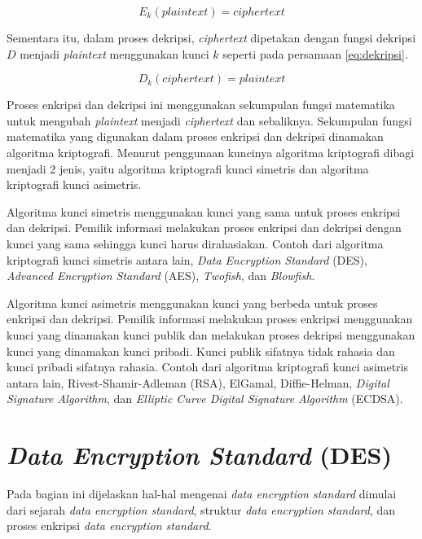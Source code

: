 \begin{equation}
	E_k(plaintext) = ciphertext
	\label{eq:enkripsi}
\end{equation}

Sementara itu, dalam proses dekripsi, \textit{ciphertext} dipetakan dengan fungsi dekripsi \begin{math}D\end{math} menjadi \textit{plaintext} menggunakan kunci \begin{math}k\end{math} seperti pada persamaan \ref{eq:dekripsi}.

\begin{equation}
	D_k(ciphertext) = plaintext
	\label{eq:dekripsi}
\end{equation}

Proses enkripsi dan dekripsi ini menggunakan sekumpulan fungsi matematika untuk mengubah \textit{plaintext} menjadi \textit{ciphertext} dan sebaliknya. Sekumpulan fungsi matematika yang digunakan dalam proses enkripsi dan dekripsi dinamakan algoritma kriptografi. Menurut penggunaan kuncinya algoritma kriptografi dibagi menjadi 2 jenis, yaitu algoritma kriptografi kunci simetris dan algoritma kriptografi kunci asimetris.

Algoritma kunci simetris menggunakan kunci yang sama untuk proses enkripsi dan dekripsi. Pemilik informasi melakukan proses enkripsi dan dekripsi dengan kunci yang sama sehingga kunci harus dirahasiakan. Contoh dari algoritma kriptografi kunci simetris antara lain, \textit{Data Encryption Standard} (DES), \textit{Advanced Encryption Standard} (AES), \textit{Twofish}, dan \textit{Blowfish}.

Algoritma kunci asimetris menggunakan kunci yang berbeda untuk proses enkripsi dan dekripsi. Pemilik informasi melakukan proses enkripsi menggunakan kunci yang dinamakan kunci publik dan melakukan proses dekripsi menggunakan kunci yang dinamakan kunci pribadi. Kunci publik sifatnya tidak rahasia dan kunci pribadi sifatnya rahasia. Contoh dari algoritma kriptografi kunci asimetris antara lain, Rivest-Shamir-Adleman (RSA), ElGamal, Diffie-Helman, \textit{Digital Signature Algorithm}, dan \textit{Elliptic Curve Digital Signature Algorithm} (ECDSA).

\section{\textit{Data Encryption Standard} (DES)}\label{sec:des}

Pada bagian ini dijelaskan hal-hal mengenai \textit{data encryption standard} dimulai dari sejarah \textit{data encryption standard}, struktur \textit{data encryption standard}, dan proses enkripsi \textit{data encryption standard}.


